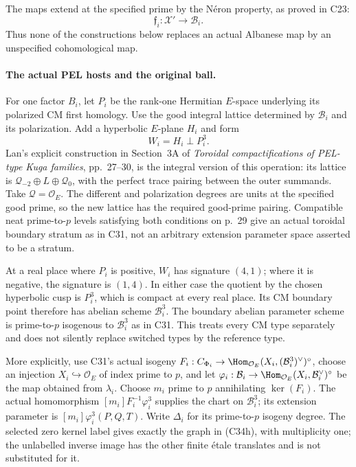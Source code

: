 \documentclass[11pt]{article}
\theoremstyle{definition}\newtheorem{definition}[theorem]{Definition}\newtheorem{remark}[theorem]{Remark}
\begin{document}
The maps extend at the specified prime by the
N\'eron property, as proved in C23:
\[
        \mathfrak f_i:\mathcal X'\longrightarrow\mathcal B_i.
                                                        \tag{C34a}
\]
Thus none of the constructions below replaces
an actual Albanese map by an unspecified
cohomological map.

\paragraph{The actual PEL hosts and the original ball.}
For one factor $B_i$, let $P_i$ be the rank-one
Hermitian $E$-space underlying its polarized
CM first homology. Use the good integral
lattice determined by $\mathcal B_i$ and its
polarization. Add a hyperbolic $E$-plane
$H_i$ and form
\[
                          W_i=H_i\perp P_i^3.          \tag{C34b}
\]
Lan's explicit construction in Section~3A of
\emph{Toroidal compactifications of PEL-type
Kuga families}, pp.~27--30, is the integral
version of this operation: its lattice is
$\mathcal Q_{-2}\oplus L\oplus\mathcal Q_0$,
with the perfect trace pairing between the
outer summands. Take $\mathcal Q=\mathcal O_E$.
The different and polarization degrees are
units at the specified good prime, so the
new lattice has the required good-prime
pairing. Compatible neat prime-to-$p$ levels
satisfying both conditions on p.~29 give
an actual toroidal boundary stratum as in
C31, not an arbitrary extension parameter
space asserted to be a stratum.

At a real place where $P_i$ is positive,
$W_i$ has signature $(4,1)$; where it is
negative, the signature is $(1,4)$. In
either case the quotient by the chosen
hyperbolic cusp is $P_i^3$, which is
compact at every real place. Its CM
boundary point therefore has abelian
scheme $\mathcal B_i^3$.
The boundary abelian parameter scheme
is prime-to-$p$ isogenous to
$\mathcal B_i^3$ as in C31. This treats
every CM type separately and does not
silently replace switched types by the
reference type.

More explicitly, use C31's actual
isogeny $F_i:C_{\Phi_i}\to
\Hom_{\mathcal O_E}(X_i,(\mathcal B_i^3)^\vee)^\circ$,
choose an injection $X_i\hookrightarrow\mathcal O_E$
of index prime to $p$, and let
$\varphi_i:\mathcal B_i\to
\Hom_{\mathcal O_E}(X_i,\mathcal B_i^\vee)^\circ$
be the map obtained from $\lambda_i$.
Choose $m_i$ prime to $p$ annihilating
$\ker(F_i)$. The actual homomorphism
$[m_i]F_i^{-1}\varphi_i^3$ supplies
the chart on $\mathcal B_i^3$; its
extension parameter is
$[m_i]\varphi_i^3(P,Q,T)$.
Write $\Delta_i$ for its prime-to-$p$
isogeny degree. The selected zero
kernel label gives exactly the graph
in (C34h), with multiplicity one;
the unlabelled inverse image has
the other finite \'etale translates
and is not substituted for it.
\end{document}
